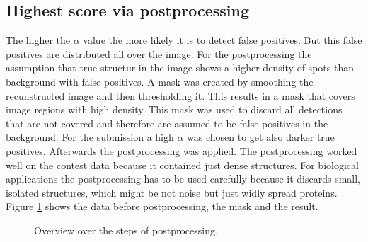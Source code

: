 \subsection{Highest score via postprocessing}
The higher the $\alpha$ value the more likely it is to detect false positives. But this false positives are distributed all over the image. For the postprocessing the assumption that true structur in the image shows a higher density of spots than background with false positives. A mask was created by smoothing the recunstructed image and then thresholding it. This results in a mask that covers image regions with high density. This mask was used to discard all detections that are not covered and therefore are assumed to be false positives in the background.\newline
For the submission a high $\alpha$ was chosen to get also darker true positives. Afterwards the postprocessing was applied. The postprocessing worked well on the contest data because it contained just dense structures. For biological applications the postprocessing has to be used carefully because it discards small, isolated structures, which might be not noise but just widly spread proteins.\newline
Figure \ref{postproc} shows the data before postprocessing, the mask and the result.
\begin{figure}
\hfill
{}\hfill	
{}

\caption{Overview over the steps of postprocessing.}
\label{postproc}	

\end{figure}


